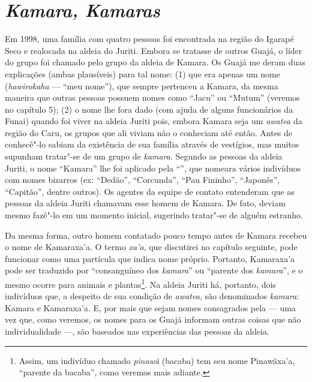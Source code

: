\section{\emph{Kamara, Kamaras}}

Em 1998, uma família com quatro pessoas foi encontrada na região do
Igarapé Seco e realocada na aldeia do  Juriti. Embora se tratasse de
outros Guajá, o líder do grupo foi chamado pelo grupo da aldeia de
Kamara. Os Guajá me deram duas explicações (ambas plausíveis) para tal
nome: (1) que era apenas um nome (\emph{hawirokaha} --- ``meu nome''), que
sempre pertenceu a Kamara, da mesma maneira que outras pessoas possuem
nomes como ``Jacu'' ou ``Mutum'' (veremos no capítulo 5); (2) o nome lhe
fora dado (com ajuda de alguns funcionários da Funai) quando foi viver
na aldeia Juriti pois, embora Kamara seja um \emph{awatea} da região do
Caru, os grupos que ali viviam não o conheciam até então. Antes de
conhecê"-lo sabiam da existência de sua família através de vestígios, mas
muitos supunham tratar"-se de um grupo de \emph{kamara}. Segundo as
pessoas da aldeia Juriti, o nome ``Kamara'' lhe foi aplicado pela ``'',
que nomeara vários indivíduos com nomes bizarros (ex: ``Dedão'',
``Corcunda'', ``Pau Fininho'', ``Japonês'', ``Capitão'', dentre outros). Os
agentes da equipe de contato entenderam que as pessoas da aldeia Juriti
chamavam esse homem de Kamara. De fato, deviam mesmo fazê"-lo em um
momento inicial, sugerindo tratar"-se de alguém estranho.

Da mesma forma, outro homem contatado pouco tempo antes de Kamara
recebeu o nome de Kamaraxa'a. O termo \emph{xa'a}, que discutirei no
capítulo seguinte, pode funcionar como uma partícula que indica nome
próprio. Portanto, Kamaraxa'a pode ser traduzido por ``consanguíneo dos
\emph{kamara}'' ou ``parente dos \emph{kamara}'', e o mesmo ocorre para
animais e plantas\footnote{Assim, um indivíduo chamado \emph{pinawã}
  (bacaba) tem seu nome Pinawãxa'a, ``parente da bacaba'', como veremos
  mais adiante.}. Na aldeia Juriti há, portanto, dois indivíduos que, a
despeito de sua condição de \emph{awatea}, são denominados
\emph{kamara}: Kamara e Kamaraxa'a. E, por mais que sejam nomes
consagrados pela  --- uma vez que, como veremos, os nomes para os
Guajá informam outras coisas que não individualidade ---, são baseados nas
experiências das pessoas da aldeia.

